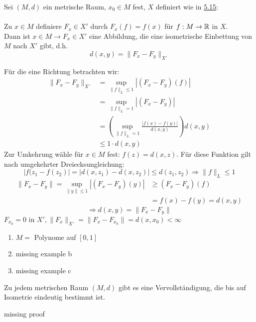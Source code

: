 \begin{satz}
	Sei $(M,d)$ ein metrische Raum, $x_{0} \in M$ fest, $X$ definiert wie in \hyperref[def:5.15-Lipschitz]{5.15}: \\ \\
	Zu $x \in M$ definiere $F_{x} \in X'$ durch $F_{x}(f) = f(x)$ für $f: M \rightarrow \mathbb{R}$ in $X$. \\
	Dann ist $x \in M \rightarrow F_{x} \in X'$ eine Abbildung, die eine isometrische Einbettung von $M$ nach $X'$ gibt, d.h. 
	\[ d(x, y) = \| F_{x} - F_{y} \|_{X'} \]
\end{satz}
\begin{beweis}
	Für die eine Richtung betrachten wir:
	\begin{align*}
		\| F_{x} - F_{y} \|_{X'}  & = \sup_{\| f \|_{L} \leq 1} |(F_{x} - F_{y})(f)| \\
								  & = \sup_{\| f \|_{L} = 1} |(F_{x} - F_{y})| \\
								  & = \left( \sup_{\| f \|_{L} = 1} \frac{|f(x) - f(y)|}{d(x, y)} \right) d(x, y) \\
								  & \leq 1 \cdot d(x, y)
	\end{align*}
	Zur Umkehrung wähle für $x \in M$ fest: $f(z) = d(x, z)$. Für diese Funktion gilt nach umgekehrter Dreiecksungleichung: \\
	\[ |f(z_{1} - f(z_{2})| = | d(x, z_{1}) - d(x, z_{2}) | \leq d(z_{1}, z_{2}) \Rightarrow \| f \|_{L} \leq 1 \]
	\begin{align*}
		\| F_{x} - F_{y} \| = \sup_{\|y \| \leq 1} |(F_{x} - F_{y})(y)| & \geq (F_{x} - F_{y})(f) \\
																		& = f(x) - f(y) = d(x, y)
	\end{align*}
	\[ \Rightarrow d(x, y) = \| F_{x} - F_{y} \| \]
	$F_{x_{0}} = 0$ in $X', \| F_{x} \|_{X'} = \| F_{x} - F_{x_{0}} \| = d(x, x_{0}) < \infty$
\end{beweis}

\begin{beispiel}
	\begin{enumerate}[label=\alph*\upshape)]	
		\item $M =$ Polynome auf $[0, 1]$
		\item missing example b
		\item missing example c	
	\end{enumerate}
\end{beispiel} %

\begin{satz}
	Zu jedem metrischen Raum $(M, d)$ gibt es eine Vervollständigung, die bis auf Isometrie eindeutig bestimmt ist.
\end{satz}
\begin{beweis}
	missing proof %
\end{beweis}

